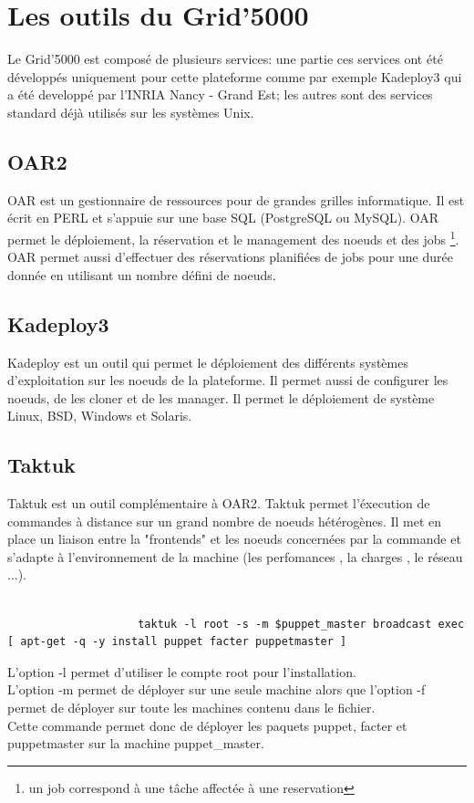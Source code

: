 \documentclass[a4paper, 10pt, onecolumn]{report}
\begin{document}
	\section{Les outils du Grid'5000}
		Le Grid'5000 est composé de plusieurs services: une partie ces services ont été développés uniquement pour cette plateforme comme par exemple Kadeploy3 qui a été developpé par l'INRIA Nancy - Grand Est; les autres sont des services standard déjà utilisés sur les systèmes Unix.  
		\subsection{OAR2}			
			OAR est un gestionnaire de ressources pour de grandes grilles informatique. Il est écrit en PERL et s'appuie sur une base SQL (PostgreSQL ou MySQL). OAR permet le déploiement, la réservation  et le management des noeuds et des jobs \footnote{un job correspond à une t\^ache affectée à une reservation}. OAR permet aussi d'effectuer des réservations planifiées de jobs pour une durée donnée en utilisant un nombre défini de noeuds. \\
			
		\subsection{Kadeploy3}
			Kadeploy est un outil qui permet le déploiement des différents systèmes d'exploitation sur les noeuds de la plateforme. Il permet aussi de configurer les noeuds, de les cloner et de les manager. Il permet le déploiement de système Linux, BSD, Windows et Solaris.
		\subsection{Taktuk}
			Taktuk est un outil complémentaire à OAR2. Taktuk permet l'éxecution de commandes à distance sur un grand nombre de noeuds hétérogènes. Il met en place un liaison entre la "frontends" et les noeuds concernées par la commande et s'adapte  à l'environnement de la machine (les perfomances , la charges , le réseau ...). \\
			\\ 
			\begin{lstlisting}
					taktuk -l root -s -m $puppet_master broadcast exec [ apt-get -q -y install puppet facter puppetmaster ]
			\end{lstlisting}
			L'option -l permet d'utiliser le compte root pour l'installation.\\
			L'option -m permet de déployer sur une seule machine alors que l'option -f permet de déployer sur toute les machines contenu dans le fichier.\\
			Cette commande permet donc de déployer les paquets puppet, facter et puppetmaster sur la machine puppet\_master.
			
\end{document}
